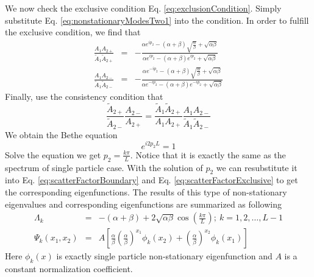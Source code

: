 \documentclass[12pt,a4paper]{article}
\begin{document}
We now check the exclusive condition Eq. \eqref{eq:exclusionCondition}. Simply
substitute Eq.  \eqref{eq:nonstationaryModesTwo1} into the condition. In order to
fulfill the exclusive condition, we find that 
\begin{subequations}
    \label{eq:scatterFactorExclusive}
    \begin{eqnarray}
        \frac{A_{1}A_{2+}}{\tilde{A}_{1}\tilde{A}_{2+}} & = & -\frac{\alpha
            e^{ip_2}-(\alpha+\beta) \sqrt{\frac{\alpha}{\beta}} +
            \sqrt{\alpha\beta} }{\alpha e^{ip_2} -(\alpha+\beta)e^{ip_2} +
            \sqrt{\alpha\beta} } \\
        \frac{A_{1}A_{2-}}{\tilde{A}_{1}\tilde{A}_{2-}} & = & -\frac{\alpha
            e^{-ip_2}-(\alpha+\beta) \sqrt{\frac{\alpha}{\beta}} +
            \sqrt{\alpha\beta} }{\alpha e^{-ip_2} -(\alpha+\beta)e^{-ip_2} +
            \sqrt{\alpha\beta} } 
    \end{eqnarray}
\end{subequations}
Finally, use the consistency condition that
\begin{equation}
    \label{eq:consistencyConditionTwo}
    \frac{\tilde{A}_{2+}}{\tilde{A}_{2-}}\frac{A_{2-}}{A_{2+}} = 
    \frac{\tilde{A}_{1}\tilde{A}_{2+}}{A_{1}A_{2+}}
    \frac{A_{1}A_{2-}}{\tilde{A}_{1}\tilde{A}_{2-}}
\end{equation}
We obtain the Bethe equation 
\begin{equation}
    \label{eq:betheEqTwo1}
    e^{i2p_2L} = 1
\end{equation}
Solve the equation we get $p_2=\frac{k\pi}{L}$. Notice that it is exactly the
same as the spectrum of single particle case. With the solution of $p_2$ we can
resubstitute it into Eq. \eqref{eq:scatterFactorBoundary} and Eq.
\eqref{eq:scatterFactorExclusive} to get the corresponding eigenfunctions. 
The results of this type of non-stationary eigenvalues and corresponding
eigenfunctions are summarized as following 
\begin{subequations}
    \label{eq:eigenTwo}
    \begin{eqnarray}
        \label{eq:eigenvaluesTwo}
        \Lambda_k & = &
        -(\alpha+\beta) + 2\sqrt{\alpha\beta}\cos(\frac{k\pi}{L});
        ~k=1,2,\dots, L-1  \\
        \label{eq:eigenvectorsTwo}
        \Psi_k(x_1, x_2) & = & A\left[ \frac{\alpha}{\beta}
            \left(\frac{\alpha}{\beta}
            \right)^{x_1}\phi_k(x_2)+\left(\frac{\alpha}{\beta}\right)^{x_2}
            \phi_k(x_1) \right]
    \end{eqnarray}
\end{subequations}
Here $\phi_k(x)$ is exactly single particle non-stationary eigenfunction and
$A$ is a constant normalization coefficient.
\end{document}
